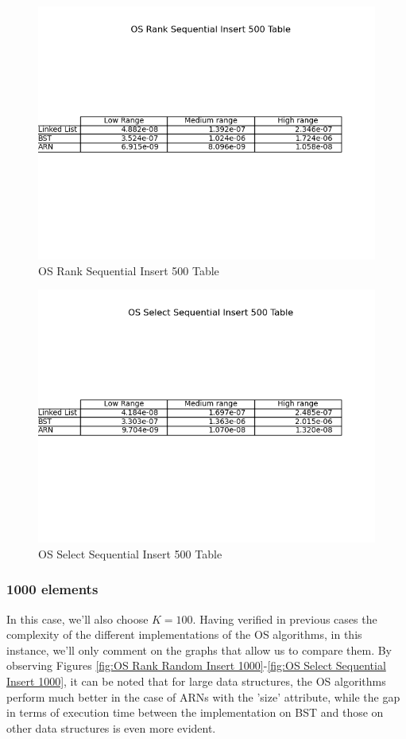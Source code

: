 \documentclass[11pt]{article}
\begin{document}
 \begin{figure}[H]
  \centering
  \includegraphics[width=0.8\linewidth]{Images/500/OS Rank Sequential Insert 500 Table.png}
  \caption{OS Rank Sequential Insert 500 Table }
  \label{fig:OS Rank Sequential Insert 500 Table}
\end{figure}
 \begin{figure}[H]
  \centering
  \includegraphics[width=0.8\linewidth]{Images/500/OS Select Sequential Insert 500 Table.png}
  \caption{OS Select Sequential Insert 500 Table }
  \label{fig:OS Select Sequential Insert 500 Table}
\end{figure}
\subsubsection{1000 elements}

In this case, we'll also choose $K = 100$. Having verified in previous cases the complexity of the different implementations of the OS algorithms, in this instance, we'll only comment on the graphs that allow us to compare them. By observing Figures \ref{fig:OS Rank Random Insert 1000}-\ref{fig:OS Select Sequential Insert 1000}, it can be noted that for large data structures, the OS algorithms perform much better in the case of ARNs with the 'size' attribute, while the gap in terms of execution time between the implementation on BST and those on other data structures is even more evident.
\end{document}
